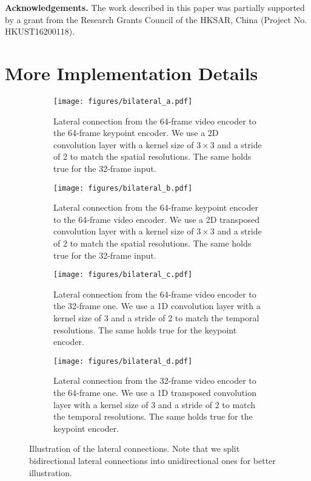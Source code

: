 \documentclass[10pt,twocolumn,letterpaper]{article}
\begin{document}
\small\noindent \textbf{Acknowledgements.}
The work described in this paper was partially supported by a grant from the Research Grants Council of the HKSAR, China (Project No. HKUST16200118). 
{\small


}

\appendix
\section{More Implementation Details}
\begin{figure*}[t]
    \centering
    \begin{subfigure}[b]{0.45\textwidth}
     \centering
     \texttt{[image: figures/bilateral\_a.pdf]}
     \caption{Lateral connection from the 64-frame video encoder to the 64-frame keypoint encoder. We use a 2D convolution layer with a kernel size of $3\times 3$ and a stride of 2 to match the spatial resolutions. The same holds true for the 32-frame input.}
     \label{fig:bilat_A}
    \end{subfigure}
    \quad\quad
    \begin{subfigure}[b]{0.45\textwidth}
     \centering
     \texttt{[image: figures/bilateral\_b.pdf]}
     \caption{Lateral connection from the 64-frame keypoint encoder to the 64-frame video encoder. We use a 2D transposed convolution layer with a kernel size of $3\times 3$ and a stride of 2 to match the spatial resolutions. The same holds true for the 32-frame input.}
     \label{fig:bilat_B}
    \end{subfigure}
    
    \begin{subfigure}[b]{0.45\textwidth}
     \centering
     \texttt{[image: figures/bilateral\_c.pdf]}
     \caption{Lateral connection from the 64-frame video encoder to the 32-frame one. We use a 1D convolution layer with a kernel size of 3 and a stride of 2 to match the temporal resolutions. The same holds true for the keypoint encoder.}
     \label{fig:bilat_C}
    \end{subfigure}
    \quad\quad
    \begin{subfigure}[b]{0.45\textwidth}
     \centering
     \texttt{[image: figures/bilateral\_d.pdf]}
     \caption{Lateral connection from the 32-frame video encoder to the 64-frame one. We use a 1D transposed convolution layer with a kernel size of 3 and a stride of 2 to match the temporal resolutions. The same holds true for the keypoint encoder.}
     \label{fig:bilat_D}
    \end{subfigure}

    \caption{Illustration of the lateral connections. Note that we split bidirectional lateral connections into unidirectional ones for better illustration.}
    \label{fig:bilat}
\end{figure*}
\end{document}
